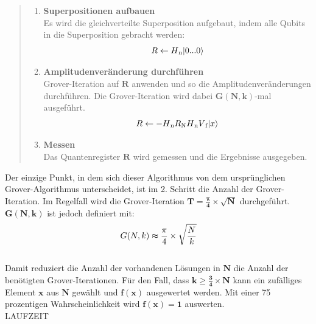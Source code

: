 \begin{quote}
    \begin{enumerate}
        \item \textbf{Superpositionen aufbauen}
        \\
        Es wird die gleichverteilte Superposition aufgebaut, indem alle Qubits in die Superposition gebracht werden:
        \\
        \begin{equation}
            R \leftarrow H\textsubscript{n} |0 ... 0\rangle 
        \end{equation}
        \item \textbf{Amplitudenveränderung durchführen}
        \\
        Grover-Iteration auf $\mathbf{R}$ anwenden und so die Amplitudenveränderungen durchführen. Die Grover-Iteration wird dabei $\mathbf{G(N,k)}$-mal ausgeführt.
        \\
        \begin{equation}
            R \leftarrow -H\textsubscript{n} R\textsubscript{N} H\textsubscript{n} V\textsubscript{f} |x\rangle
        \end{equation}
        \item \textbf{Messen}
        \\
        Das Quantenregister $\mathbf{R}$ wird gemessen und die Ergebnisse ausgegeben.
    \end{enumerate}
\end{quote}

Der einzige Punkt, in dem sich dieser Algorithmus von dem ursprünglichen Grover-Algorithmus unterscheidet, ist im 2. Schritt die Anzahl der Grover-Iteration. 
Im Regelfall wird die Grover-Iteration $\mathbf{T = \frac{\pmb\pi}{4} \times \sqrt{N}}$ durchgeführt. $\mathbf{G(N,k)}$ ist jedoch definiert mit:
\\
\begin{equation}
    {G(N,k) \thickapprox \frac{\pi}{4} \times \sqrt{\frac{N}{k}}}
\end{equation}
\\
Damit reduziert die Anzahl der vorhandenen Lösungen in $\mathbf{N}$ die Anzahl der benötigten Grover-Iterationen. 
Für den Fall, dass $\mathbf{k \geq \frac{3}{4} \times N}$ kann ein zufälliges Element $\mathbf{x}$ aus $\mathbf{N}$ gewählt und $\mathbf{f(x)}$ ausgewertet werden. 
Mit einer 75 prozentigen Wahrscheinlichkeit wird $\mathbf{f(x) = 1}$ auswerten.
\\
LAUFZEIT

